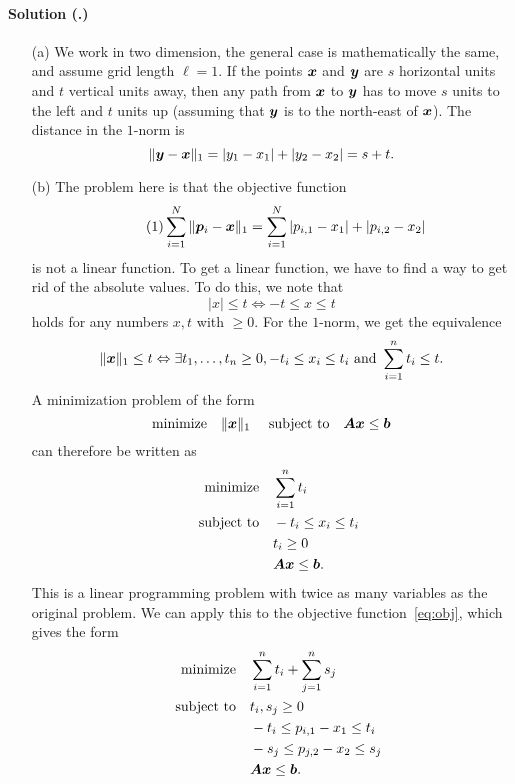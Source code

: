 \documentclass{article}
\newcounter{problemSheetNumber}
\newcounter{problems}
\renewcommand{\solution}[1]{\paragraph{Solution (\theproblemSheetNumber.\theproblems)}\addtocounter{problems}{1}\label{#1}}
\begin{document}
\solution{pr6} 
\begin{itemize}
 \item[(a)] We work in two dimension, the general case is mathematically the same, and assume grid length $\ell=1$. If the points $\bm{x}$ and $\bm{y}$ are $s$ horizontal units and $t$ vertical units away, then any path from $\bm{x}$ to $\bm{y}$ has to move $s$ units to the left and $t$ units up (assuming that $\bm{y}$ is to the north-east of $\bm{x}$). The distance in the $1$-norm is
 \begin{equation*}
  \Vert {\bm{y}-\bm{x}}\Vert_1 = |y_1-x_1|+|y_2-x_2| = s+t. 
 \end{equation*}
 \item[(b)] The problem here is that the objective function
 \begin{equation}\label{eq:obj}\tag{1}
  \sum_{i=1}^N\Vert {\bm{p}_i-\bm{x}}\Vert_1 = \sum_{i=1}^N|p_{i,1}-x_1|+|p_{i,2}-x_2|
 \end{equation}
 is not a linear function. To get a linear function, we have to find a way to get rid of the absolute values. To do this, we note that
 \begin{equation*}
  |x|\leq t \Leftrightarrow -t\leq x\leq t
 \end{equation*}
holds for any numbers $x,t$ with $\geq 0$. For the $1$-norm, we get the equivalence
\begin{equation*}
 \Vert {\bm{x}}\Vert_1 \leq t \Leftrightarrow \exists t_1,\dots,t_n\geq 0, -t_i\leq x_i\leq t_i \text{ and } \sum_{i=1}^n t_i\leq t.
\end{equation*}
A minimization problem of the form
\begin{equation*}
 \minimize \norm{\vct{x}}_1 \ \subjto \mtx{A}\vct{x}\leq \vct{b}
\end{equation*}
can therefore be written as
\begin{align*}
 \text{minimize}\quad &\sum_{i=1}^n t_i\\
 \quad\text{subject to}\quad & -t_i\leq x_i \leq t_i\\
 &t_i\geq 0\\
 & \bm{A}\bm{x}\leq \bm{b}.
\end{align*}
This is a linear programming problem with twice as many variables as the original problem. We can apply this to the objective function~\eqref{eq:obj}, which gives the form
\begin{align*}
 \text{minimize}\quad & \sum_{i=1}^n t_i+\sum_{j=1}^n s_j\\
 \quad\text{subject to}\quad & t_i, s_j\geq 0\\
 & -t_i\leq p_{i,1}-x_1\leq t_i\\
 & -s_j\leq p_{j,2}-x_2\leq s_j\\
 & \bm{A}\bm{x}\leq \bm{b}.
\end{align*}

\end{itemize}

 
\end{document}

